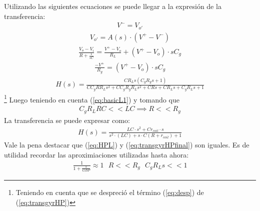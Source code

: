 Utilizando las siguientes ecuaciones se puede llegar a la expresión de la transferencia:
\begin{align}V^- = V_{o'}\end{align}
\begin{align}V_{o'} = A(s)\cdot (V^+-V^-)\end{align}
\begin{align}\frac{V_o-V_i}{R+\frac{1}{sC}} = \frac{V^+-V_o}{R_L}+(V^+-V_o)\cdot sC_g\end{align}
\begin{align}\frac{-V^+}{R_g}=(V^+-V_o)\cdot sC_g\end{align}
\begin{align} H(s) = \frac{C R_L s \left(C_g R_g s + 1\right)}{C C_g R R_L s^{2} + C C_g R_g R_L s^{2} + C R s + C R_L s + C_g R_L s + 1}\label{eq:transgyrHP}\end{align}\footnote{Teniendo en cuenta que se despreció el término (\ref{eq:desp}) de (\ref{eq:transgyrHP})}
Luego teniendo en cuenta (\ref{eq:basicL1}) y tomando que
\begin{align} C_gR_LRC<<LC \implies R<<R_g \end{align}
La transferencia  se puede expresar como:
 \begin{align} H(s) = \frac{LC\cdot s^2+Cr_{coil}\cdot s}{s^2 \cdot (LC)+s\cdot C(R+r_{coil})+1}\label{eq:transgyrHPfinal} 
\end{align}
Vale la pena destacar que (\ref{eq:HPL}) y (\ref{eq:transgyrHPfinal}) son iguales.
Es de utilidad recordar las aproximiaciones utilizadas hasta ahora:
\begin{align}  \frac{1}{1+\frac{s}{GBP}}\approx 1  \ \ \ R<<R_g \ \ \ C_gR_Ls << 1 \label{eq:basicL2}\end{align}
